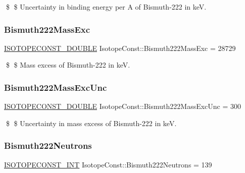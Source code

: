 \$ \$ Uncertainty in binding energy per A of Bismuth-\/222 in keV. \mbox{\label{group___isotope_const-_bismuth-_bi222_gaa60032eafb8dafa8b4984a26e6ffdb2e}} 
\subsubsection{\texorpdfstring{Bismuth222\+Mass\+Exc}{Bismuth222MassExc}}
{\footnotesize\ttfamily \mbox{\hyperlink{group___isotope_const-_macros_ga8f45a7272ce02c0b4c65c44636ed719a}{I\+S\+O\+T\+O\+P\+E\+C\+O\+N\+S\+T\+\_\+\+D\+O\+U\+B\+LE}} Isotope\+Const\+::\+Bismuth222\+Mass\+Exc = 28729}

\$ \$ Mass excess of Bismuth-\/222 in keV. \mbox{\label{group___isotope_const-_bismuth-_bi222_ga7101ecbd4cc56aa9df466b0156a5aefd}} 
\subsubsection{\texorpdfstring{Bismuth222\+Mass\+Exc\+Unc}{Bismuth222MassExcUnc}}
{\footnotesize\ttfamily \mbox{\hyperlink{group___isotope_const-_macros_ga8f45a7272ce02c0b4c65c44636ed719a}{I\+S\+O\+T\+O\+P\+E\+C\+O\+N\+S\+T\+\_\+\+D\+O\+U\+B\+LE}} Isotope\+Const\+::\+Bismuth222\+Mass\+Exc\+Unc = 300}

\$ \$ Uncertainty in mass excess of Bismuth-\/222 in keV. \mbox{\label{group___isotope_const-_bismuth-_bi222_gab4371b4c44b4619464758a643f7c3c33}} 
\subsubsection{\texorpdfstring{Bismuth222\+Neutrons}{Bismuth222Neutrons}}
{\footnotesize\ttfamily \mbox{\hyperlink{group___isotope_const-_macros_ga5f18360b3e99483a35c32d789e62621c}{I\+S\+O\+T\+O\+P\+E\+C\+O\+N\+S\+T\+\_\+\+I\+NT}} Isotope\+Const\+::\+Bismuth222\+Neutrons = 139}

